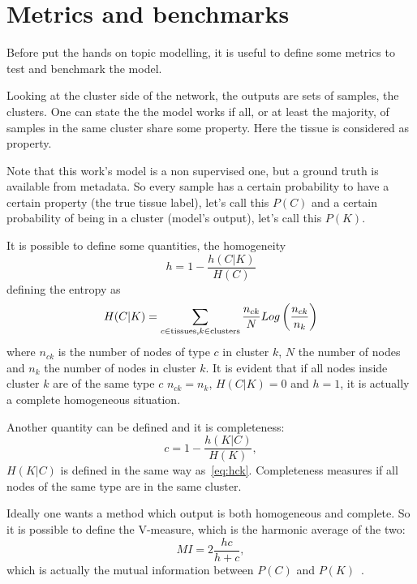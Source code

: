 \section{Metrics and benchmarks}
Before put the hands on topic modelling, it is useful to define some metrics to test and benchmark the model.

Looking at the cluster side of the network, the outputs are sets of samples, the clusters. One can state the the model works if all, or at least the majority, of samples in the same cluster share some property. Here the tissue is considered as property.

Note that this work's model is a non supervised one, but a ground truth is available from metadata. So every sample has a certain probability to have a certain property (the true tissue label), let's call this $P(C)$ and a certain probability of being in a cluster (model's output), let's call this $P(K)$.

It is possible to define some quantities, the homogeneity
\begin{equation}\label{eq:homogeneity}
    h=1-\frac{h(C|K)}{H(C)}
\end{equation}
defining the entropy as
\begin{equation}\label{eq:hck}
    H(C|K)=\sum_{c\in \mathrm{tissues},\\ k \in \mathrm{clusters}}\frac{n_{c k}}{N}Log\left(\frac{n_{c k}}{n_k}\right)
\end{equation}
where $n_{c k}$ is the number of nodes of type $c$ in cluster $k$, $N$ the number of nodes and $n_k$ the number of nodes in cluster $k$. It is evident that if all nodes inside cluster $k$ are of the same type $c$ $n_{c k}=n_{k}$, $H(C|K)=0$ and $h=1$, it is actually a complete homogeneous situation.

Another quantity can be defined and it is completeness:
\begin{equation}\label{eq:completness}
    c=1-\frac{h(K|C)}{H(K)},
\end{equation}
$H(K|C)$ is defined in the same way as~\ref{eq:hck}. Completeness measures if all nodes of the same type are in the same cluster.

Ideally one wants a method which output is both homogeneous and complete. So it is possible to define the V-measure, which is the harmonic average of the two:
\begin{equation}\label{eq:mutualinformation}
    MI=2\frac{h c}{h + c},
\end{equation}
which is actually the mutual information between $P(C)$ and $P(K)$~\cite{rosenberg2007v}.

